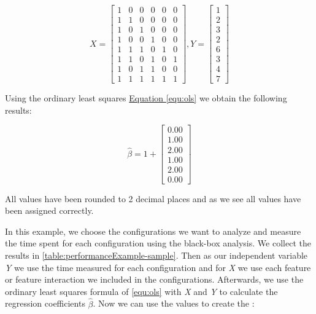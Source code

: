 \begin{equation}\label{equ:exampleIndependentDependent}
    \textit{X} = 
    \begin{bmatrix} 
        1 & 0 & 0 & 0 & 0 & 0 \\
        1 & 1 & 0 & 0 & 0 & 0 \\
        1 & 0 & 1 & 0 & 0 & 0 \\
        1 & 0 & 0 & 1 & 0 & 0 \\
        1 & 1 & 1 & 0 & 1 & 0 \\
        1 & 1 & 0 & 1 & 0 & 1 \\
        1 & 0 & 1 & 1 & 0 & 0 \\
        1 & 1 & 1 & 1 & 1 & 1 
      \end{bmatrix}
      ,
      \textit{Y} =
      \begin{bmatrix}
        1 \\
        2 \\
        3 \\
        2 \\
        6 \\
        3 \\
        4 \\
        7 
      \end{bmatrix}
\end{equation}


Using the ordinary least squares \hyperref[equ:ols]{Equation \ref*{equ:ols}}  we obtain the following results:

\begin{equation}
    \hat{\beta} = 1 + 
    \begin{bmatrix}
        0.00 \\
        1.00 \\
        2.00 \\
        1.00 \\
        2.00 \\
        0.00
    \end{bmatrix}
\end{equation}

All values have been rounded to 2 decimal places and as we see all values have been assigned correctly.

In this example, we choose the configurations we want to analyze and measure the time spent for each configuration using the black-box analysis. 
We collect the results in \autoref{table:performanceExample-sample}. 
Then as our independent variable \textit{Y} we use the time measured for each configuration 
and for \textit{X} we use each feature or feature interaction we included in the configurations. 
Afterwards, we use the ordinary least squares formula of \autoref{equ:ols} with \textit{X} and \textit{Y} to calculate the regression coefficients $\hat{\beta}$. 
Now we can use the values to create the \perfInfluenceModel:

